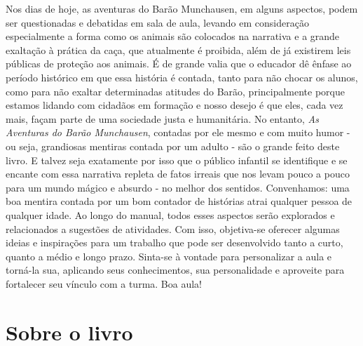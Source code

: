 \documentclass[11pt]{extarticle}
\begin{document}

Nos dias de hoje, as aventuras do Barão Munchausen, em alguns aspectos, podem ser questionadas e debatidas em sala de aula, levando em consideração especialmente a forma como os animais são colocados na narrativa e a grande exaltação à prática da caça, que atualmente é proibida, além de já existirem leis públicas de proteção aos animais. É de grande valia que o educador dê ênfase ao período histórico em que essa história é contada, tanto para não chocar os alunos, como para não exaltar determinadas atitudes do Barão, principalmente porque estamos lidando com cidadãos em formação e nosso desejo é que eles, cada vez mais, façam parte de uma sociedade justa e humanitária. No entanto, \textit{As Aventuras do Barão Munchausen}, contadas por ele mesmo e com muito humor - ou seja, grandiosas mentiras contada por um adulto - são o grande feito deste livro. E talvez seja exatamente por isso que o público infantil se identifique e se encante com essa narrativa repleta de fatos irreais que nos levam pouco a pouco para um mundo mágico e absurdo - no melhor dos sentidos. Convenhamos: uma boa mentira contada por um bom contador de histórias atrai qualquer pessoa de qualquer idade. Ao longo do manual, todos esses aspectos serão explorados e relacionados a sugestões de atividades. Com isso, objetiva-se oferecer algumas ideias e inspirações para um trabalho que pode ser desenvolvido tanto a curto, quanto a médio e longo prazo. Sinta-se à vontade para personalizar a aula e torná-la sua, aplicando seus conhecimentos, sua personalidade e aproveite para fortalecer seu vínculo com a turma. Boa aula!



\section{Sobre o livro}
\end{document}
